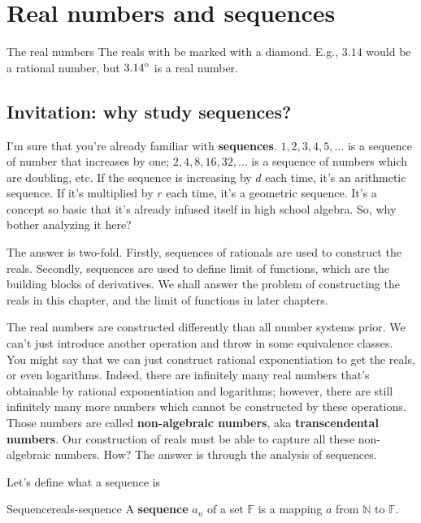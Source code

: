 \chapter{Real numbers and sequences}
\label{sec:real_numbers_and_sequences}

\begin{notation}{The real numbers}
  The reals with be marked with a diamond. E.g., \(3.14\) would be a rational number,
  but \(3.14^{\diamond}\) is a real number.
\end{notation}

\section{Invitation: why study sequences?}
\label{sec:reals-intro}

I'm sure that you're already familiar with \textbf{sequences}. $1, 2, 3, 4, 5, \dots$
is a sequence of number that increases by one; $2, 4, 8, 16, 32, \dots$ is a sequence
of numbers which are doubling, etc. If the sequence is increasing by $d$ each time, it's an
arithmetic sequence. If it's multiplied by $r$ each time, it's a geometric sequence. It's a concept
so basic that it's already infused itself in high school algebra. So, why bother analyzing it here?

The answer is two-fold. Firstly, sequences of rationals are used to construct the reals.
Secondly, sequences are used to define limit of functions, which are the building blocks
of derivatives. We shall answer the problem of constructing the reals in this chapter,
and the limit of functions in later chapters.

The real numbers are constructed differently than all number systems prior. We can't
just introduce another operation and throw in some equivalence classes. You might say
that we can just construct rational exponentiation to get the reals, or even logarithms.
Indeed, there are infinitely many real numbers that's obtainable by rational exponentiation
and logarithms; however, there are still infinitely many more numbers which cannot be
constructed by these operations. Those numbers are called \textbf{non-algebraic numbers},
aka \textbf{transcendental numbers}. Our construction of reals must be able to capture
all these non-algebraic numbers. How? The answer is through the analysis of sequences.

Let's define what a sequence is
\begin{df}{Sequence}{reals-sequence}
  A \textbf{sequence} $a_n$ of a set $\mathbb{F}$ is a mapping $a$ from $\mathbb{N}$
  to $\mathbb{F}$.
\end{df}

